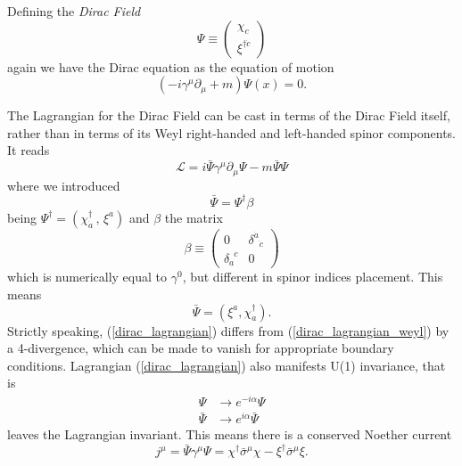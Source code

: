 Defining the \textit{Dirac Field}
\begin{equation}
\Psi \equiv\left(\begin{array}{c}
\chi_{c} \\
\xi^{\dagger \dot{c}}
\end{array}\right)
\end{equation}
again we have the Dirac equation as the equation of motion
\begin{equation}
    (-i\gamma^\mu\partial_\mu+m)\Psi(x)=0.
\end{equation}

The Lagrangian for the Dirac Field can be cast in terms of the Dirac Field itself, rather than in terms of its Weyl right-handed and left-handed spinor components. It reads
\begin{equation}
    \mathcal{L}=i\bar{\Psi}\gamma^\mu\partial_\mu\Psi-m\bar{\Psi}\Psi
    \label{dirac_lagrangian}
\end{equation}
where we introduced
\begin{equation}
    \bar{\Psi}=\Psi^\dagger\beta
\end{equation}
being $\Psi^\dagger=(\chi^\dagger_{\dot{a}}\,,\,\xi^a)$ and $\beta$ the matrix
\begin{equation}
\beta \equiv\left(\begin{array}{cc}
0 & \delta^{\dot{a}}{ }_{\dot{c}} \\
\delta_{a}^{\phantom{a}c} & 0
\end{array}\right)
\end{equation}
which is numerically equal to $\gamma^0$, but different in spinor indices placement. This means
\begin{equation}
\bar{\Psi}=(\xi^a,\chi^\dagger_{\dot{a}}).    
\end{equation}
Strictly speaking, (\ref{dirac_lagrangian}) differs from (\ref{dirac_lagrangian_weyl}) by a 4-divergence, which can be made to vanish for appropriate boundary conditions. Lagrangian (\ref{dirac_lagrangian}) also manifests U(1) invariance, that is
\begin{equation}
    \begin{aligned}
    \Psi&\to e^{-i\alpha}\Psi\\
    \bar{\Psi}&\to e^{i\alpha}\bar{\Psi}
    \end{aligned}
\end{equation}
leaves the Lagrangian invariant. This means there is a conserved Noether current
\begin{equation}
    j^\mu=\bar{\Psi}\gamma^\mu\Psi=\chi^\dagger\bar{\sigma}^\mu\chi-\xi^\dagger\bar{\sigma}^\mu\xi.
\end{equation}

